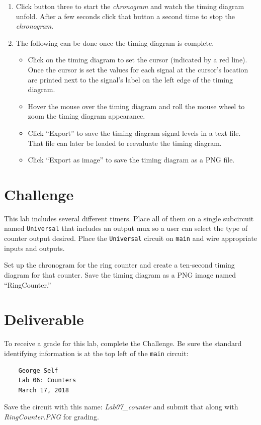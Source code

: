 \begin{enumerate}
	\item Click button three to start the \textit{chronogram} and watch the timing diagram unfold. After a few seconds click that button a second time to stop the \textit{chronogram}.
	
	\item The following can be done once the timing diagram is complete.
	
	\begin{itemize}
		\item Click on the timing diagram to set the cursor (indicated by a red line). Once the cursor is set the values for each signal at the cursor's location are printed next to the signal's label on the left edge of the timing diagram.
		\item Hover the mouse over the timing diagram and roll the mouse wheel to zoom the timing diagram appearance.
		\item Click ``Export'' to save the timing diagram signal levels in a text file. That file can later be loaded to reevaluate the timing diagram.
		\item Click ``Export as image'' to save the timing diagram as a PNG file.
	\end{itemize}
	
\end{enumerate}

\section{Challenge}

This lab includes several different timers. Place all of them on a single subcircuit named \lstinline[columns=fixed]|Universal| that includes an output mux so a user can select the type of counter output desired. Place the \lstinline[columns=fixed]|Universal| circuit on \lstinline[columns=fixed]|main| and wire appropriate inputs and outputs.

Set up the chronogram for the ring counter and create a ten-second timing diagram for that counter. Save the timing diagram as a PNG image named ``RingCounter.''

\section{Deliverable}

To receive a grade for this lab, complete the Challenge. Be sure the standard identifying information is at the top left of the \lstinline{main} circuit: 

\bigskip
\begin{minipage}{\linewidth}
	\begin{verbatim}
	George Self
	Lab 06: Counters
	March 17, 2018
	\end{verbatim}
\end{minipage}
\bigskip

Save the circuit with this name: \textit{Lab07\_counter} and submit that along with \textit{RingCounter.PNG} for grading.

